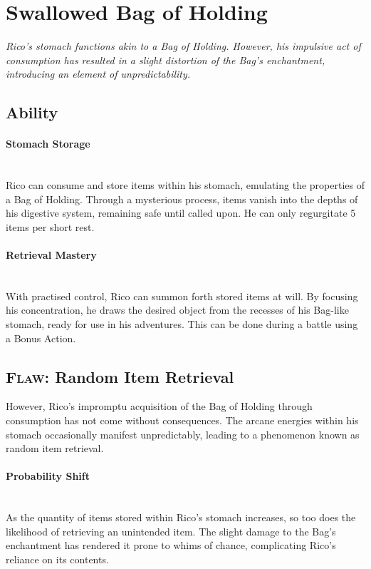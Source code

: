 {\section*{Swallowed Bag of Holding}
\textit{Rico's stomach functions akin to a Bag of Holding. However, his impulsive act of consumption has resulted in a slight distortion of the Bag's enchantment, introducing an element of unpredictability.}
\subsection*{Ability}
\paragraph*{Stomach Storage}\hfill\\
Rico can consume and store items within his stomach, emulating the properties of a Bag of Holding. Through a mysterious process, items vanish into the depths of his digestive system, remaining safe until called upon. He can only regurgitate 5 items per short rest.
\paragraph*{Retrieval Mastery}\hfill\\
With practised control, Rico can summon forth stored items at will. By focusing his concentration, he draws the desired object from the recesses of his Bag-like stomach, ready for use in his adventures. This can be done during a battle using a Bonus Action.
\subsection*{\textsc{Flaw}: Random Item Retrieval}
However, Rico's impromptu acquisition of the Bag of Holding through consumption has not come without consequences. The arcane energies within his stomach occasionally manifest unpredictably, leading to a phenomenon known as random item retrieval.\\
\paragraph*{Probability Shift}\hfill\\
As the quantity of items stored within Rico's stomach increases, so too does the likelihood of retrieving an unintended item. The slight damage to the Bag's enchantment has rendered it prone to whims of chance, complicating Rico's reliance on its contents.
}
